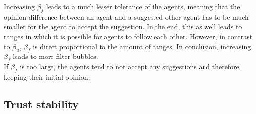 \documentclass[11pt]{article}
\begin{document}
Increasing $\beta_f$ leads to a much lesser tolerance of the agents, meaning that the opinion difference between an agent and a suggested other agent has to be much smaller for the agent to accept the suggestion. In the end, this as well leads to ranges in which it is possible for agents to follow each other. However, in contrast to $\beta_u$, $\beta_f$ is direct proportional to the amount of ranges. In conclusion, increasing $\beta_f$ leads to more filter bubbles.\\
If $\beta_f$ is too large, the agents tend to not accept any suggestions and therefore keeping their initial opinion.

\subsection{Trust stability}
\end{document}
